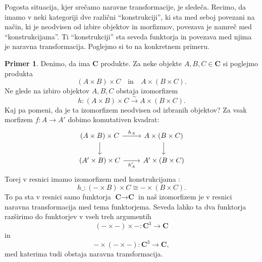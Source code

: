 \documentclass[12pt,a4paper]{book}
\theoremstyle{definition}
\theoremstyle{plain}
\theoremstyle{definition}
\newtheorem{primer}{Primer}[section]
\theoremstyle{remark}
\newcommand{\cat}[1]{\textbf{#1}}
\begin{document}
Pogosta situacija, kjer srečamo naravne transformacije, je sledeča. Recimo, da imamo v neki kategoriji dve različni "`konstrukciji"', ki sta med seboj povezani na način, ki je neodvisen od izbire objektov in morfizmov, povezava je namreč med "`konstrukcijama"'. Ti "`konstrukciji"' sta seveda funktorja in povezava med njima je naravna transformacija. Poglejmo si to na konkretnem primeru.

\begin{primer}
Denimo, da ima $\cat{C}$ produkte. Za neke objekte $A,B,C \in \cat{C}$ si poglejmo produkta
$$(A \times B) \times C \quad \text{in} \quad A \times (B \times C).$$
Ne glede na izbiro objektov $A,B,C$ obstaja izomorfizem
$$h : (A \times B) \times C \xrightarrow{\sim} A \times (B \times C).$$
Kaj pa pomeni, da je ta izomorfizem neodvisen od izbranih objektov? Za vsak morfizem $f : A \to A'$ dobimo komutativen kvadrat:
%
$$ \begin{tikzcd}
(A \times B) \times C \ar[r, "h_A"] \ar[d] & A \times (B \times C) \ar[d] \\
(A' \times B) \times C \ar[r, "h_A'"'] & A' \times (B \times C) 
\end{tikzcd} $$
Torej v resnici imamo izomorfizem med konstrukcijama :
$$h\_ : (- \times B) \times C \cong - \times (B \times C).$$
To pa sta v resnici samo funktorja $\cat{C} \to \cat{C}$ in naš izomorfizem je v resnici naravna transformacija med tema funktorjema. Seveda lahko ta dva funktorja razširimo do funktorjev v vseh treh argumentih
$$(- \times -) \times - : \cat{C}^3 \to \cat{C}$$
in
$$ - \times (- \times -) : \cat{C}^3 \to \cat{C},$$
med katerima tudi obstaja naravna transformacija.
\end{primer}
\end{document}
